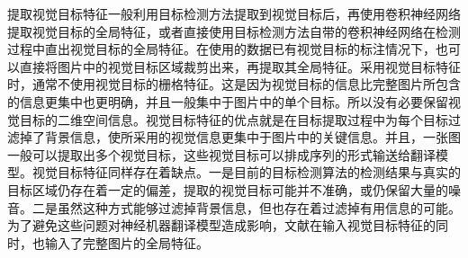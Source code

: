 提取视觉目标特征一般利用目标检测方法提取到视觉目标后，再使用卷积神经网络提取视觉目标的全局特征，或者直接使用目标检测方法自带的卷积神经网络在检测过程中直出视觉目标的全局特征。在使用的数据已有视觉目标的标注情况下，也可以直接将图片中的视觉目标区域裁剪出来，再提取其全局特征。采用视觉目标特征时，通常不使用视觉目标的栅格特征。这是因为视觉目标的信息比完整图片所包含的信息更集中也更明确，并且一般集中于图片中的单个目标。所以没有必要保留视觉目标的二维空间信息。视觉目标特征的优点就是在目标提取过程中为每个目标过滤掉了背景信息，使所采用的视觉信息更集中于图片中的关键信息。并且，一张图一般可以提取出多个视觉目标，这些视觉目标可以排成序列的形式输送给翻译模型。视觉目标特征同样存在着缺点。一是目前的目标检测算法的检测结果与真实的目标区域仍存在着一定的偏差，提取的视觉目标可能并不准确，或仍保留大量的噪音。二是虽然这种方式能够过滤掉背景信息，但也存在着过滤掉有用信息的可能。为了避免这些问题对神经机器翻译模型造成影响，文献\cite{35_huang-etal-2016-attention,48_DBLP:conf/aaai/WangX21,39_ive-etal-2019-distilling,111_ive-etal-2021-exploiting}在输入视觉目标特征的同时，也输入了完整图片的全局特征。









